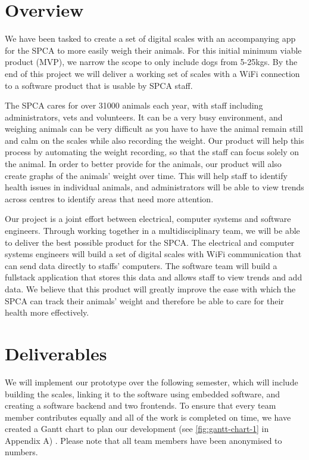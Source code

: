 
\chapter{Overview}

We have been tasked to create a set of digital scales with an accompanying app for the SPCA to more easily weigh their animals. For this initial minimum viable product (MVP), we narrow the scope to only include dogs from 5-25kgs. By the end of this project we will deliver a working set of scales with a WiFi connection to a software product that is usable by SPCA staff. 

The SPCA cares for over 31000 animals each year, with staff including administrators, vets and volunteers. It can be a very busy environment, and weighing animals can be very difficult as you have to have the animal remain still and calm on the scales while also recording the weight. Our product will help this process by automating the weight recording, so that the staff can focus solely on the animal. In order to better provide for the animals, our product will also create graphs of the animals’ weight over time. This will help staff to identify health issues in individual animals, and administrators will be able to view trends across centres to identify areas that need more attention. 

Our project is a joint effort between electrical, computer systems and software engineers. Through working together in a multidisciplinary team, we will be able to deliver the best possible product for the SPCA. The electrical and computer systems engineers will build a set of digital scales with WiFi communication that can send data directly to staffs’ computers. The software team will build a fullstack application that stores this data and allows staff to view trends and add data. We believe that this product will greatly improve the ease with which the SPCA can track their animals’ weight and therefore be able to care for their health more effectively.


\chapter{Deliverables}


We will implement our prototype over the following semester, which will include building the scales, linking it to the software using embedded software, and creating a software backend and two frontends. To ensure that every team member contributes equally and all of the work is completed on time, we have created a Gantt chart to plan our development (see \ref{fig:gantt-chart-1} in Appendix A) . Please note that all team members have been anonymised to numbers. 

